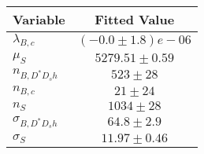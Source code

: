 \begin{tabular}[t]{lc}
\hline
Variable &Fitted Value\\
\hline\hline
$\lambda_{B,c}$&$(-0.0\pm1.8)e-06$\\
\hline
$\mu_S$&$5279.51\pm0.59$\\
\hline
$n_{B, D^* D_s h}$&$523\pm28$\\
\hline
$n_{B,c}$&$21\pm24$\\
\hline
$n_S$&$1034\pm28$\\
\hline
$\sigma_{B, D^* D_s h}$&$64.8\pm2.9$\\
\hline
$\sigma_S$&$11.97\pm0.46$\\
\hline
\end{tabular}